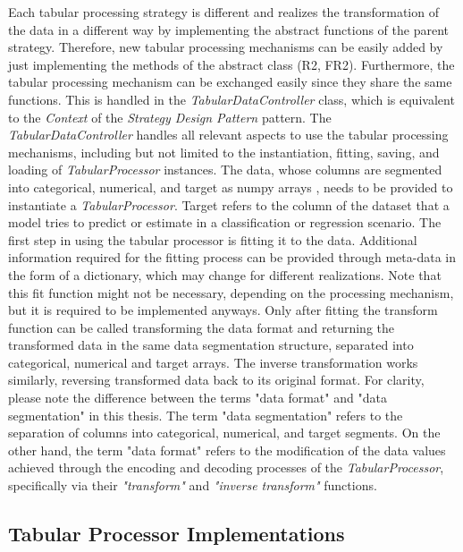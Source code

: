 Each tabular processing strategy is different and realizes the transformation of the data in a different way by implementing the abstract functions of the parent strategy.
Therefore, new tabular processing mechanisms can be easily added by just implementing the methods of the abstract class (R2, FR2).
Furthermore, the tabular processing mechanism can be exchanged easily since they share the same functions.
This is handled in the \textit{TabularDataController} class, which is equivalent to the \textit{Context} of the \textit{Strategy Design Pattern} pattern.
The \textit{TabularDataController} handles all relevant aspects to use the tabular processing mechanisms, including but not limited to the instantiation, fitting, saving, and loading of \textit{TabularProcessor} instances.
The data, whose columns are segmented into categorical, numerical, and target as numpy arrays \cite{harris2020array}, needs to be provided to instantiate a \textit{TabularProcessor}.
Target refers to the column of the dataset that a \gls{model} tries to predict or estimate in a classification or regression scenario.
The first step in using the tabular processor is fitting it to the data.
Additional information required for the fitting process can be provided through meta-data in the form of a dictionary, which may change for different realizations.
Note that this fit function might not be necessary, depending on the processing mechanism, but it is required to be implemented anyways.
Only after fitting the transform function can be called transforming the data format and returning the transformed data in the same data segmentation structure, \ie separated into categorical, numerical and target arrays.
The inverse transformation works similarly, reversing transformed data back to its original format.
For clarity, please note the difference between the terms "data format" and "data segmentation" in this thesis.
The term "data segmentation" refers to the separation of columns into categorical, numerical, and target segments.
On the other hand, the term "data format" refers to the modification of the data values achieved through the encoding and decoding processes of the \textit{TabularProcessor}, specifically via their \textit{"transform"} and \textit{"inverse transform"} functions.

\subsection{Tabular Processor Implementations}
\label{ch:architecture-tabularProcessor-implementations}

